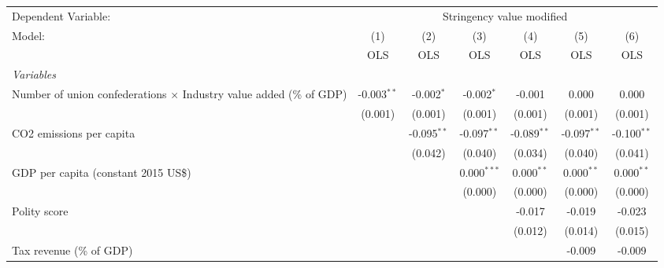 
\begingroup
\centering
\begin{tabular}{lcccccc}
   \toprule
   Dependent Variable: & \multicolumn{6}{c}{Stringency value modified}\\
   Model:                                                                     & (1)           & (2)           & (3)           & (4)           & (5)           & (6)\\  
                                                                              &  OLS          & OLS           & OLS           & OLS           & OLS           & OLS\\  
   \midrule
   \emph{Variables}\\
   Number of union confederations $\times$ Industry value added (\% of GDP)   & -0.003$^{**}$ & -0.002$^{*}$  & -0.002$^{*}$  & -0.001        & 0.000         & 0.000\\   
                                                                              & (0.001)       & (0.001)       & (0.001)       & (0.001)       & (0.001)       & (0.001)\\   
   CO2 emissions per capita                                                   &               & -0.095$^{**}$ & -0.097$^{**}$ & -0.089$^{**}$ & -0.097$^{**}$ & -0.100$^{**}$\\   
                                                                              &               & (0.042)       & (0.040)       & (0.034)       & (0.040)       & (0.041)\\   
   GDP per capita (constant 2015 US\$)                                        &               &               & 0.000$^{***}$ & 0.000$^{**}$  & 0.000$^{**}$  & 0.000$^{**}$\\   
                                                                              &               &               & (0.000)       & (0.000)       & (0.000)       & (0.000)\\   
   Polity score                                                               &               &               &               & -0.017        & -0.019        & -0.023\\   
                                                                              &               &               &               & (0.012)       & (0.014)       & (0.015)\\   
   Tax revenue (\% of GDP)                                                    &               &               &               &               & -0.009        & -0.009\\   

\end{tabular}
